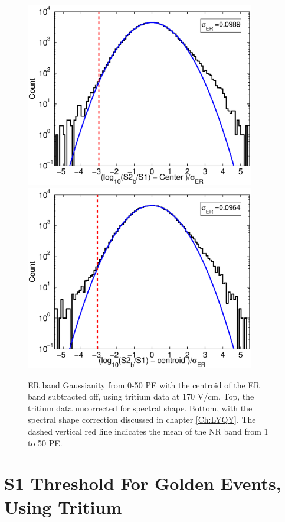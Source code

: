 \renewcommand{\baselinestretch}{1}
\small\normalsize
\begin{figure}[h!]\centering
\includegraphics[width=100mm]{Chapter_T/Figures/ER_Band/GaussER_rawSpec.eps}
\includegraphics[width=100mm]{Chapter_T/Figures/ER_Band/GaussER.eps}
\caption{ER band Gaussianity from 0-50 PE with the centroid of the ER band subtracted off, using tritium data at 170 V/cm. Top, the tritium data uncorrected for spectral shape. Bottom, with the spectral shape correction discussed in chapter \ref{Ch:LYQY}. The dashed vertical red line indicates the mean of the NR band from 1 to 50 PE.}
\label{fig:Gaussianity}
\end{figure}
\renewcommand{\baselinestretch}{2}
\small\normalsize

\newpage



\section{S1 Threshold For Golden Events, Using Tritium}

